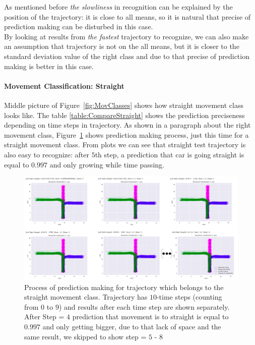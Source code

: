 As mentioned before \textit{the slowliness} in recognition can be explained by the position of the trajectory: it is close to all means, so it is natural that precise of prediction making can be disturbed in this case. \\
By looking at results from \textit{the fastest} trajectory to recognize, we can also make an assumption that trajectory is not on the all means, but it is closer to the standard deviation value of the right class and due to that precise of prediction making is better in this case. \\

\paragraph{Movement Classification: Straight}

Middle picture of Figure~\ref{fig:MovClasses} shows how straight movement class looks like. The table \ref{table:CompareStraight} shows the prediction preciseness depending on time steps in trajectory. As shown in a paragraph about the right movement class,  Figure~\ref{fig:straightPrediction} shows prediction making process, just this time for a straight movement class. From plots we can see that straight test trajectory is also easy to recognize: after $5$th step, a prediction that car is going straight is equal to $0.997$ and only growing while time passing. 

\begin{figure}[H]
	\centering  	
	\includegraphics[width=17cm]{img/0_prediction_straight.PNG}
	\caption{Process of prediction making for trajectory which belongs to the straight movement class. Trajectory has $10$-time steps (counting from $0$ to $9$) and results after each time step are shown separately. After Step = $4$  prediction that movement is to straight is equal to $0.997$ and only getting bigger, due to that lack of space and the same result, we skipped to show step = $5$ - $8$}
	\label{fig:straightPrediction}    
\end{figure}

